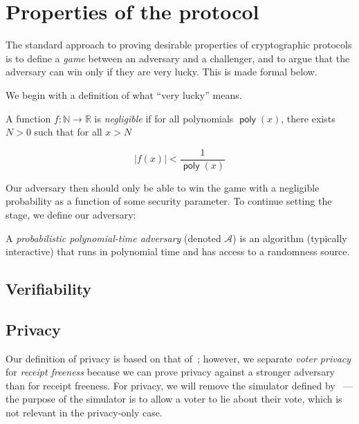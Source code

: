 \documentclass[11pt,twoside,a4paper]{article}
\DeclareMathOperator{\poly}{\mathsf{poly}}
\theoremstyle{definition}
\begin{document}
\section{Properties of the protocol}\label{sec-properties}
The standard approach to proving desirable properties of cryptographic protocols is to define a \textit{game} between an adversary and a challenger, and to argue that the adversary can win only if they are very lucky. This is made formal below.

We begin with a definition of what ``very lucky'' means.
\begin{definition}
    A function \(f:\mathbb{N}\rightarrow\mathbb{R}\) is \textit{negligible} if for all polynomials \(\poly(x)\), there exists \(N>0\) such that for all \(x>N\)

    \[|f(x)|<\frac{1}{\poly(x)}\]
\end{definition}
Our adversary then should only be able to win the game with a negligible probability as a function of some security parameter. To continue setting the stage, we define our adversary:
\begin{definition}
    A \textit{probabilistic polynomial-time adversary} (denoted \(\mathcal{A}\)) is an algorithm (typically interactive) that runs in polynomial time and has access to a randomness source.
\end{definition}
\subsection{Verifiability}
\subsection{Privacy}
Our definition of privacy is based on that of~\cite{kiayias2015end}; however, we separate \textit{voter privacy} for \textit{receipt freeness} because we can prove privacy against a stronger adversary than for receipt freeness. For privacy, we will remove the simulator defined by~\cite{kiayias2015end} --- the purpose of the simulator is to allow a voter to lie about their vote, which is not relevant in the privacy-only case.
\end{document}
